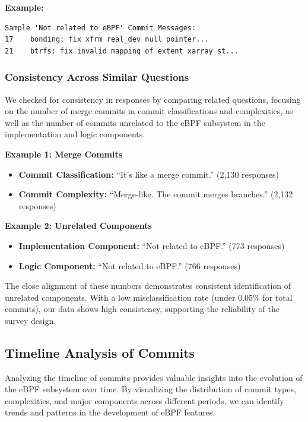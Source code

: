 \textbf{Example:}
\begin{verbatim}
Sample 'Not related to eBPF' Commit Messages:
17    bonding: fix xfrm real_dev null pointer...
21    btrfs: fix invalid mapping of extent xarray st...
\end{verbatim}

\subsubsection{Consistency Across Similar Questions}

We checked for consistency in responses by comparing related questions, focusing on the number of merge commits in commit classifications and complexities, as well as the number of commits unrelated to the eBPF subsystem in the implementation and logic components.

\textbf{Example 1: Merge Commits}
\begin{itemize}
    \item \textbf{Commit Classification:} ``It's like a merge commit.'' (2,130 responses)
    \item \textbf{Commit Complexity:} ``Merge-like. The commit merges branches.'' (2,132 responses)
\end{itemize}

\textbf{Example 2: Unrelated Components}
\begin{itemize}
    \item \textbf{Implementation Component:} ``Not related to eBPF.'' (773 responses)
    \item \textbf{Logic Component:} ``Not related to eBPF.'' (766 responses)
\end{itemize}

The close alignment of these numbers demonstrates consistent identification of unrelated components. With a low misclassification rate (under 0.05\% for total commits), our data shows high consistency, supporting the reliability of the survey design.

\subsection{Timeline Analysis of Commits}

Analyzing the timeline of commits provides valuable insights into the evolution of the eBPF subsystem over time. By visualizing the distribution of commit types, complexities, and major components across different periods, we can identify trends and patterns in the development of eBPF features.

